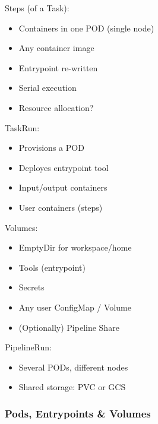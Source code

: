 \documentclass[aspectratio=169,11pt,hyperref={colorlinks=true}]{beamer}
\begin{document}
\begin{lblackrwhiteframe}
\begin{blackframe}
\begin{2columnsframe}
  {
  Steps (of a Task):
  \begin{itemize}
    \item Containers in one POD (single node)
    \item Any container image
    \item Entrypoint re-written
    \item Serial execution
    \item Resource allocation?
  \end{itemize}
  \vspace{3ex}
  TaskRun:
  \begin{itemize}
    \item Provisions a POD
    \item Deployes entrypoint tool
    \item Input/output containers
    \item User containers (steps)
  \end{itemize}
  }
  {
  Volumes:
  \begin{itemize}
    \item EmptyDir for workspace/home
    \item Tools (entrypoint)
    \item Secrets
    \item Any user ConfigMap / Volume
    \item (Optionally) Pipeline Share
  \end{itemize}
  \vspace{3ex}
  PipelineRun:
  \begin{itemize}
    \item Several PODs, different nodes
    \item Shared storage: PVC or GCS
  \end{itemize}
  }
  \frametitle{Pods, Entrypoints \& Volumes}
\end{2columnsframe}


\end{blackframe}
\end{lblackrwhiteframe}
\end{document}
